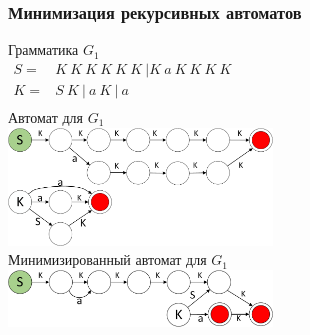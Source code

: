 \documentclass{beamer}
\begin{document}
	\begin{frame} 
		\frametitle{Минимизация рекурсивных автоматов}
		\vspace{-12pt}
		\begin{center}
			{Грамматика $G_1$\\
			\vspace{5pt}
			$
			\begin{array}{rl}
			S =& K\ K\ K\ K\ K\ K \ |K\ a\ K\ K\ K\ K \\
			K =& S\ K\ |\ a\ K\ |\ a \\
			\end{array}
			$
			}
		    \\
		    \vspace{12pt}
		    Автомат для $G_1$
		    \\
		    \vspace{5pt}
		    {
				\includegraphics[width=7cm]{pictures/G1initial.pdf}
			}\\
			\vspace{8pt}
			Минимизированный автомат для $G_1$
			\\
			\vspace{5pt}
		    {
				\includegraphics[width=7cm]{pictures/G1automaton.pdf}
			}
		\end{center}
	\end{frame}
	
\end{document}
